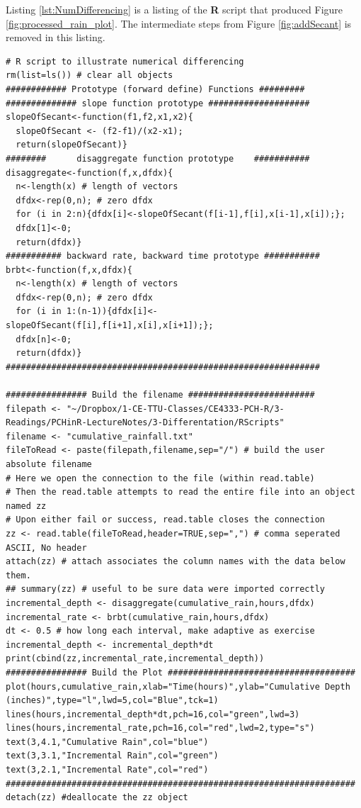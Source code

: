 Listing \ref{lst:NumDifferencing} is a listing of the \textbf{R} script that produced Figure \ref{fig:processed_rain_plot}.  
The intermediate steps from Figure \ref{fig:addSecant} is removed in this listing.

\begin{lstlisting}[caption=R code demonstrating Numerical Differencing , label=lst:NumDifferencing]
# R script to illustrate numerical differencing 
rm(list=ls()) # clear all objects
############ Prototype (forward define) Functions #########
############## slope function prototype ####################
slopeOfSecant<-function(f1,f2,x1,x2){
  slopeOfSecant <- (f2-f1)/(x2-x1);
  return(slopeOfSecant)}
########      disaggregate function prototype    ###########
disaggregate<-function(f,x,dfdx){
  n<-length(x) # length of vectors
  dfdx<-rep(0,n); # zero dfdx
  for (i in 2:n){dfdx[i]<-slopeOfSecant(f[i-1],f[i],x[i-1],x[i]);};
  dfdx[1]<-0;
  return(dfdx)} 
########### backward rate, backward time prototype ###########
brbt<-function(f,x,dfdx){
  n<-length(x) # length of vectors
  dfdx<-rep(0,n); # zero dfdx
  for (i in 1:(n-1)){dfdx[i]<-slopeOfSecant(f[i],f[i+1],x[i],x[i+1]);};
  dfdx[n]<-0;
  return(dfdx)}
##############################################################

################ Build the filename #########################
filepath <- "~/Dropbox/1-CE-TTU-Classes/CE4333-PCH-R/3-Readings/PCHinR-LectureNotes/3-Differentation/RScripts"
filename <- "cumulative_rainfall.txt"
fileToRead <- paste(filepath,filename,sep="/") # build the user absolute filename
# Here we open the connection to the file (within read.table)
# Then the read.table attempts to read the entire file into an object named zz
# Upon either fail or success, read.table closes the connection
zz <- read.table(fileToRead,header=TRUE,sep=",") # comma seperated ASCII, No header
attach(zz) # attach associates the column names with the data below them.
## summary(zz) # useful to be sure data were imported correctly
incremental_depth <- disaggregate(cumulative_rain,hours,dfdx)
incremental_rate <- brbt(cumulative_rain,hours,dfdx)
dt <- 0.5 # how long each interval, make adaptive as exercise
incremental_depth <- incremental_depth*dt
print(cbind(zz,incremental_rate,incremental_depth))
################ Build the Plot #####################################
plot(hours,cumulative_rain,xlab="Time(hours)",ylab="Cumulative Depth 
(inches)",type="l",lwd=5,col="Blue",tck=1)
lines(hours,incremental_depth*dt,pch=16,col="green",lwd=3)
lines(hours,incremental_rate,pch=16,col="red",lwd=2,type="s")
text(3,4.1,"Cumulative Rain",col="blue")
text(3,3.1,"Incremental Rain",col="green")
text(3,2.1,"Incremental Rate",col="red")
#####################################################################
detach(zz) #deallocate the zz object
\end{lstlisting}

